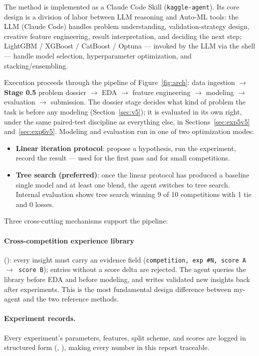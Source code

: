 \documentclass[11pt,a4paper]{article}
\begin{document}
The method is implemented as a Claude Code Skill (\texttt{kaggle-agent}). Its core design is a division of labor between LLM reasoning and Auto-ML tools: the LLM (Claude Code) handles problem understanding, validation-strategy design, creative feature engineering, result interpretation, and deciding the next step; LightGBM / XGBoost / CatBoost / Optuna --- invoked by the LLM via the shell --- handle model selection, hyperparameter optimization, and stacking/ensembling.

Execution proceeds through the pipeline of Figure~\ref{fig:arch}: data ingestion $\to$ \textbf{Stage 0.5} problem dossier $\to$ EDA $\to$ feature engineering $\to$ modeling $\to$ evaluation $\to$ submission. The dossier stage decides what kind of problem the task is before any modeling (Section~\ref{sec:v5}); it is evaluated in its own right, under the same paired-test discipline as everything else, in Sections~\ref{sec:exp5v5} and~\ref{sec:exp6v5}. Modeling and evaluation run in one of two optimization modes:

\begin{itemize}[leftmargin=*]
  \item \textbf{Linear iteration protocol}: propose a hypothesis, run the experiment, record the result --- used for the first pass and for small competitions.
  \item \textbf{Tree search (preferred)}: once the linear protocol has produced a baseline single model and at least one blend, the agent switches to tree search. Internal evaluation shows tree search winning 9 of 10 competitions with 1 tie and 0 losses.
\end{itemize}

Three cross-cutting mechanisms support the pipeline:

\paragraph{Cross-competition experience library} (): every insight must carry an evidence field (\texttt{competition, exp \#N, score A $\to$ score B}); entries without a score delta are rejected. The agent queries the library before EDA and before modeling, and writes validated new insights back after experiments. This is the most fundamental design difference between my-agent and the two reference methods.

\paragraph{Experiment records.} Every experiment's parameters, features, split scheme, and scores are logged in structured form (, ), making every number in this report traceable.
\end{document}
